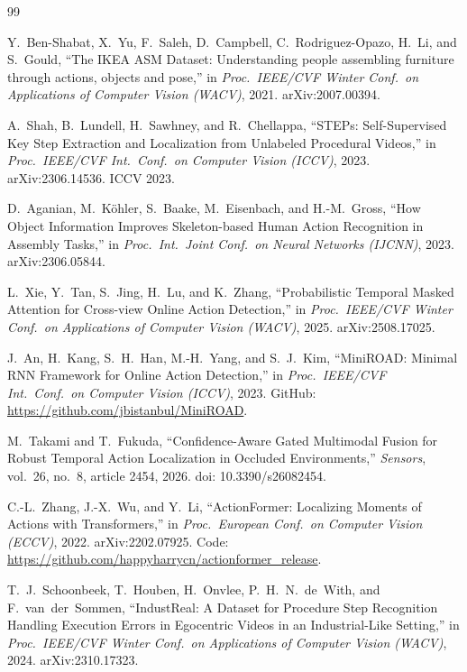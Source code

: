 \documentclass[11pt,a4paper]{article}
\begin{document}
\begin{thebibliography}{99}

Y.~Ben-Shabat, X.~Yu, F.~Saleh, D.~Campbell, C.~Rodriguez-Opazo, H.~Li, and S.~Gould,
``The IKEA ASM Dataset: Understanding people assembling furniture through actions, objects and pose,''
in \emph{Proc.\ IEEE/CVF Winter Conf.\ on Applications of Computer Vision (WACV)}, 2021.
arXiv:2007.00394.

A.~Shah, B.~Lundell, H.~Sawhney, and R.~Chellappa,
``STEPs: Self-Supervised Key Step Extraction and Localization from Unlabeled Procedural Videos,''
in \emph{Proc.\ IEEE/CVF Int.\ Conf.\ on Computer Vision (ICCV)}, 2023.
arXiv:2306.14536. ICCV 2023.

D.~Aganian, M.~K\"ohler, S.~Baake, M.~Eisenbach, and H.-M.~Gross,
``How Object Information Improves Skeleton-based Human Action Recognition in Assembly Tasks,''
in \emph{Proc.\ Int.\ Joint Conf.\ on Neural Networks (IJCNN)}, 2023.
arXiv:2306.05844.

L.~Xie, Y.~Tan, S.~Jing, H.~Lu, and K.~Zhang,
``Probabilistic Temporal Masked Attention for Cross-view Online Action Detection,''
in \emph{Proc.\ IEEE/CVF Winter Conf.\ on Applications of Computer Vision (WACV)}, 2025.
arXiv:2508.17025.

J.~An, H.~Kang, S.~H.~Han, M.-H.~Yang, and S.~J.~Kim,
``MiniROAD: Minimal RNN Framework for Online Action Detection,''
in \emph{Proc.\ IEEE/CVF Int.\ Conf.\ on Computer Vision (ICCV)}, 2023.
GitHub: \url{https://github.com/jbistanbul/MiniROAD}.

M.~Takami and T.~Fukuda,
``Confidence-Aware Gated Multimodal Fusion for Robust Temporal Action Localization in Occluded Environments,''
\textit{Sensors}, vol.~26, no.~8, article 2454, 2026.
doi: 10.3390/s26082454.

C.-L.~Zhang, J.-X.~Wu, and Y.~Li,
``ActionFormer: Localizing Moments of Actions with Transformers,''
in \emph{Proc.\ European Conf.\ on Computer Vision (ECCV)}, 2022.
arXiv:2202.07925.
Code: \url{https://github.com/happyharrycn/actionformer_release}.

T.~J.~Schoonbeek, T.~Houben, H.~Onvlee, P.~H.~N.~de~With, and F.~van~der~Sommen,
``IndustReal: A Dataset for Procedure Step Recognition Handling Execution Errors in Egocentric Videos in an Industrial-Like Setting,''
in \emph{Proc.\ IEEE/CVF Winter Conf.\ on Applications of Computer Vision (WACV)}, 2024.
arXiv:2310.17323.


\end{thebibliography}
\end{document}
